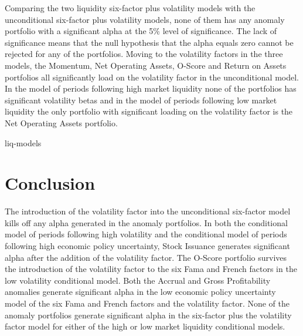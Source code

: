 \documentclass[12pt, a4paper, oneside]{article}
\begin{document}
Comparing the two liquidity six-factor plus volatility models with the unconditional six-factor plus volatility models, none of them has any anomaly portfolio with a significant alpha at the 5\% level of significance. The lack of significance means that the null hypothesis that the alpha equals zero cannot be rejected for any of the portfolios. Moving to the volatility factors in the three models, the Momentum, Net Operating Assets, O-Score and Return on Assets portfolios all significantly load on the volatility factor in the unconditional model. In the model of periods following high market liquidity none of the portfolios has significant volatility betas and in the model of periods following low market liquidity the only portfolio with significant loading on the volatility factor is the Net Operating Assets portfolio. 

{liq-models}

\section{Conclusion}\label{sec:conclusion}
The introduction of the volatility factor into the unconditional six-factor model kills off any alpha generated in the anomaly portfolios. In both the conditional model of periods following high volatility and the conditional model of periods following high economic policy uncertainty, Stock Issuance generates significant alpha after the addition of the volatility factor. The O-Score portfolio survives the introduction of the volatility factor to the six Fama and French factors in the low volatility conditional model. Both the Accrual and Gross Profitability anomalies generate significant alpha in the low economic policy uncertainty model of the six Fama and French factors and the volatility factor. None of the anomaly portfolios generate significant alpha in the six-factor plus the volatility factor model for either of the high or low market liquidity conditional models. 

\raggedbottom
\pagebreak
\onehalfspacing
\printbibliography
{}
\raggedbottom
\pagebreak
\appendix
\newcommand{\hbAppendixPrefix}{\Alph{subsection}}
%
\renewcommand{\thefigure}{\hbAppendixPrefix\arabic{figure}}
\setcounter{figure}{0}
\renewcommand{\thetable}{\hbAppendixPrefix\arabic{table}}
\setcounter{table}{0}
\renewcommand{\theequation}{\hbAppendixPrefix\arabic{equation}}
\setcounter{equation}{0}
\end{document}
